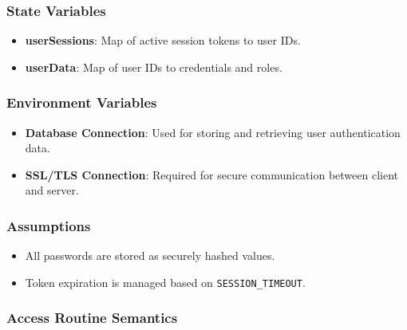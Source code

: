 \documentclass[12pt, titlepage]{article}
\begin{document}
\subsubsection{State Variables}

\begin{itemize}
    \item \textbf{userSessions}: Map of active session tokens to user IDs.
    \item \textbf{userData}: Map of user IDs to credentials and roles.
\end{itemize}

\subsubsection{Environment Variables}

\begin{itemize}
    \item \textbf{Database Connection}: Used for storing and retrieving user authentication data.
    \item \textbf{SSL/TLS Connection}: Required for secure communication between client and server.
\end{itemize}

\subsubsection{Assumptions}

\begin{itemize}
    \item All passwords are stored as securely hashed values.
    \item Token expiration is managed based on \texttt{SESSION\_TIMEOUT}.
\end{itemize}

\subsubsection{Access Routine Semantics}
\end{document}
